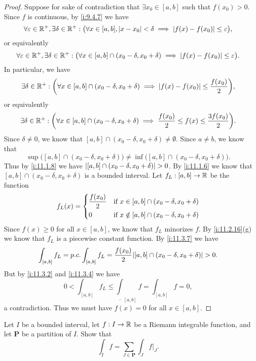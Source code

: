 \begin{proof}
  Suppose for sake of contradiction that \(\exists x_0 \in [a, b]\) such that \(f(x_0) > 0\).
  Since \(f\) is continuous, by \cref{i:9.4.7} we have
  \[
    \forall \varepsilon \in \mathbb{R}^+, \exists \delta \in \mathbb{R}^+ : \big(\forall x \in [a, b], \left\lvert x - x_0\right\rvert < \delta \implies \left\lvert f(x) - f(x_0)\right\rvert \leq \varepsilon\big),
  \]
  or equivalently
  \[
    \forall \varepsilon \in \mathbb{R}^+, \exists \delta \in \mathbb{R}^+ : \big(\forall x \in [a, b] \cap (x_0 - \delta, x_0 + \delta) \implies \left\lvert f(x) - f(x_0)\right\rvert \leq \varepsilon\big).
  \]
  In particular, we have
  \[
    \exists \delta \in \mathbb{R}^+ : \bigg(\forall x \in [a, b] \cap (x_0 - \delta, x_0 + \delta) \implies \left\lvert f(x) - f(x_0)\right\rvert \leq \dfrac{f(x_0)}{2}\bigg),
  \]
  or equivalently
  \[
    \exists \delta \in \mathbb{R}^+ : \bigg(\forall x \in [a, b] \cap (x_0 - \delta, x_0 + \delta) \implies \dfrac{f(x_0)}{2} \leq f(x) \leq \dfrac{3 f(x_0)}{2}\bigg).
  \]
  Since \(\delta \neq 0\), we know that \([a, b] \cap (x_0 - \delta, x_0 + \delta) \neq \emptyset\).
  Since \(a \neq b\), we know that
  \[
    \sup\big([a, b] \cap (x_0 - \delta, x_0 + \delta)\big) \neq \inf\big([a, b] \cap (x_0 - \delta, x_0 + \delta)\big).
  \]
  Thus by \cref{i:11.1.8} we have \(\left\lvert[a, b] \cap (x_0 - \delta, x_0 + \delta)\right\rvert > 0\).
  By \cref{i:11.1.6} we know that \([a, b] \cap (x_0 - \delta, x_0 + \delta)\) is a bounded interval.
  Let \(f_L : [a, b] \to \mathbb{R}\) be the function
  \[
    f_L(x) = \begin{dcases}
      \dfrac{f(x_0)}{2} & \text{if } x \in [a, b] \cap (x_0 - \delta, x_0 + \delta)    \\
      0                 & \text{if } x \notin [a, b] \cap (x_0 - \delta, x_0 + \delta)
    \end{dcases}
  \]
  Since \(f(x) \geq 0\) for all \(x \in [a, b]\), we know that \(f_L\) minorizes \(f\).
  By \cref{i:11.2.16}(g) we know that \(f_L\) is a piecewise constant function.
  By \cref{i:11.3.7} we have
  \[
    \int_{[a, b]} f_L = p.c. \int_{[a, b]} f_L = \dfrac{f(x_0)}{2}\abs{[a, b] \cap (x_0 - \delta, x_0 + \delta)} > 0.
  \]
  But by \cref{i:11.3.2} and \cref{i:11.3.4} we have
  \[
    0 < \int_{[a, b]} f_L \leq \underline{\int}_{[a, b]} f = \int_{[a, b]} f = 0,
  \]
  a contradiction.
  Thus we must have \(f(x) = 0\) for all \(x \in [a, b]\).
\end{proof}

\begin{ex}\label{i:ex:11.4.3}
  Let \(I\) be a bounded interval, let \(f : I \to \mathbb{R}\) be a Riemann integrable function, and let \(\mathbf{P}\) be a partition of \(I\).
  Show that
  \[
    \int_I f = \sum_{J \in \mathbf{P}} \int_J f|_J.
  \]
\end{ex}

